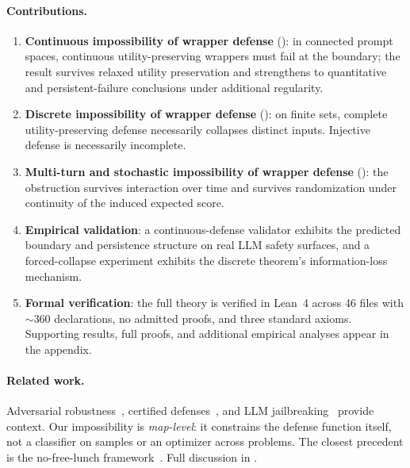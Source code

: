 \documentclass[11pt]{article}
\begin{document}
\paragraph{Contributions.}
\begin{enumerate}[nosep]
  \item \textbf{Continuous impossibility of wrapper defense}
    ():
    in connected prompt spaces, continuous utility-preserving wrappers
    must fail at the boundary; the result survives relaxed utility
    preservation and strengthens to quantitative and persistent-failure
    conclusions under additional regularity.
  \item \textbf{Discrete impossibility of wrapper defense}
    (): on finite sets, complete
    utility-preserving defense necessarily collapses distinct inputs.
    Injective defense is necessarily incomplete.
  \item \textbf{Multi-turn and stochastic impossibility of wrapper defense}
    (): the obstruction survives
    interaction over time and survives randomization under continuity of
    the induced expected score.
  \item \textbf{Empirical validation}: a continuous-defense validator
    exhibits the predicted boundary and persistence structure on real
    LLM safety surfaces, and a forced-collapse experiment exhibits the
    discrete theorem's information-loss mechanism.
  \item \textbf{Formal verification}: the full theory is verified in
    Lean~4 across 46 files with ${\sim}360$ declarations, no admitted
    proofs, and three standard axioms. Supporting results, full proofs,
    and additional empirical analyses appear in the appendix.
\end{enumerate}


\paragraph{Related work.}
Adversarial robustness~\cite{szegedy2013intriguing,goodfellow2014explaining,carlini2017evaluating,madry2018towards,tsipras2018robustness},
certified defenses~\cite{cohen2019certified,katz2017reluplex,singh2019abstract},
and LLM jailbreaking~\cite{zou2023universal,chao2024jailbreaking,mehrotra2024tree,greshake2023indirect,mouret2015illuminating,samvelyan2024rainbow}
provide context. Our impossibility is \emph{map-level}: it constrains the defense function itself, not a classifier on samples or an optimizer across problems. The closest precedent is the no-free-lunch framework~\cite{wolpert1997no}. Full discussion in .
\end{document}

